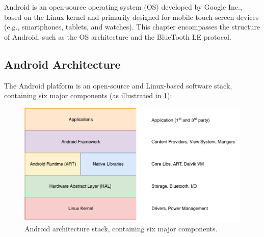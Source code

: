 Android is an open-source operating system (OS) developed by Google Inc., based on the Linux kernel and primarily designed for mobile touch-screen devices (e.g., smartphones, tablets, and watches). This chapter encompasses the structure of Android, such as the OS architecture and the BlueTooth LE protocol.

\subsection{Android Architecture}
The Android platform is an open-source and Linux-based software stack, containing six major components \cite{androidplatform} (as illustrated in \ref{fig:androidarhitecture}): 

\begin{figure}[h!]
    \centering
    \includegraphics[scale=0.85]{images/Android.pdf}
    \caption{Android architecture stack, containing six major components.}
    \label{fig:androidarhitecture}
\end{figure}


